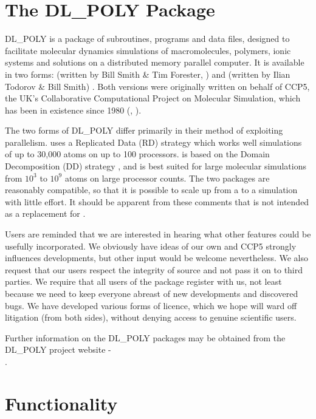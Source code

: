 \section{The DL\_POLY Package}

DL\_POLY \cite{smith-96a} is a package of subroutines, programs and
data files, designed to facilitate molecular dynamics simulations of
macromolecules, polymers, ionic systems and solutions on a
distributed memory parallel computer. It is available in two forms:
\C (written by Bill Smith \& Tim Forester, \WEC{}) and \D (written
by Ilian Todorov \& Bill Smith) \cite{todorov-04a,todorov-06a}.  Both versions
were originally written on behalf of CCP5, the UK's
Collaborative Computational Project on Molecular Simulation, which
has been in existence since 1980 (\cite{smith-87a}, \WEB{}).

The two forms of DL\_POLY differ primarily in their method of
exploiting parallelism.  \C uses a Replicated Data (RD)
strategy \cite{smith-91a,smith-93a,smith-94a,smith-94b} which
works well simulations of up to 30,000 atoms on up to 100 processors.
\D is based on the Domain Decomposition (DD) strategy
\cite{todorov-04a,todorov-06a,pinches-91a,rapaport-91b,smith-91a,smith-93a},
and is best suited for large molecular simulations from $10^{3}$
to $10^{9}$ atoms on large processor counts.  The two packages
are reasonably compatible, so that it is possible to scale up from
a \C to a \D simulation with little effort.  It should
be apparent from these comments that \D is not intended as a
replacement for \C.

Users are reminded that we are interested in hearing what other
features could be usefully incorporated.  We obviously have ideas
of our own and CCP5 strongly influences developments,
but other input would be welcome nevertheless.  We also request
that our users respect the integrity of \D source and not pass it
on to third parties.  We require that all users of the package
register with us, not least because we need to keep everyone
abreast of new developments and discovered bugs.  We have
developed various forms of licence, which we hope
will ward off litigation (from both sides), without denying access
to genuine scientific users.

Further information on the DL\_POLY packages may be obtained from
the DL\_POLY project website - \\ \noindent \WEB{}.

\section{Functionality}

